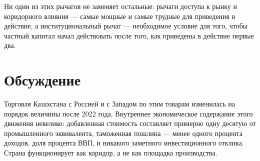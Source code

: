 \documentclass[12pt]{article}
\begin{document}
Ни один из этих рычагов не заменяет остальные: рычаги доступа к рынку и коридорного влияния
— самые мощные и самые трудные для приведения в действие, а институциональный рычаг —
необходимое условие для того, чтобы частный капитал начал действовать после того, как
приведены в действие первые два.

\section{Обсуждение}\label{sec:discussion}

Торговля Казахстана с Россией и с Западом по этим товарам изменилась на порядок величины
после 2022 года. Внутреннее экономическое содержание этого движения невелико: добавленная
стоимость составляет примерно одну десятую от промышленного эквивалента, таможенная пошлина
— менее одного процента доходов, доля процента ВВП, и никакого заметного инвестиционного
отклика. Страна функционирует как коридор, а не как площадка производства.
\end{document}
